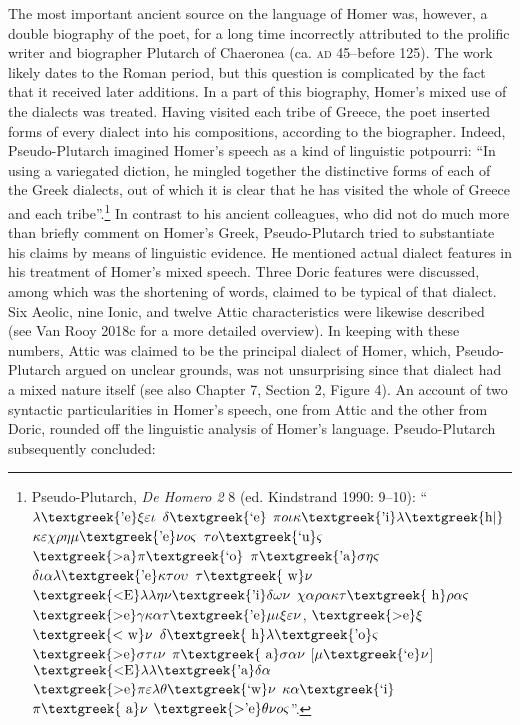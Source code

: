 \documentclass[12pt]{article}
\newenvironment{styleStandard}{\renewcommand\baselinestretch{1.25}\setlength\leftskip{0in}\setlength\rightskip{0in}\setlength\parindent{0.1972in}\setlength\parfillskip{0pt plus 1fil}\setlength\parskip{0in plus 1pt}\writerlistparindent\writerlistleftskip\leavevmode\normalfont\normalsize\writerlistlabel\ignorespaces}{\unskip\vspace{0in plus 1pt}\par}
\newcommand\writerlistleftskip{}
\newcommand\writerlistparindent{}
\newcommand\writerlistlabel{}
\newcounter{Figure}
\begin{document}
\begin{styleStandard}
The most important ancient source on the language of Homer was, however, a double biography of the poet, for a long time incorrectly attributed to the prolific writer and biographer Plutarch of Chaeronea (ca. \textsc{ad} 45–before 125). The work likely dates to the Roman period, but this question is complicated by the fact that it received later additions. In a part of this biography, Homer’s mixed use of the dialects was treated. Having visited each tribe of Greece, the poet inserted forms of every dialect into his compositions, according to the biographer. Indeed, Pseudo-Plutarch imagined Homer’s speech as a kind of linguistic potpourri: “In using a variegated diction, he mingled together the distinctive forms of each of the Greek dialects, out of which it is clear that he has visited the whole of Greece and each tribe”.\footnote{ Pseudo-Plutarch, \textit{De Homero 2} 8 (ed. Kindstrand 1990: 9–10): “$\lambda \text{\textgreek{'e}}\xi \varepsilon \iota $ $\delta \text{\textgreek{`e}}$ $\pi o\iota \kappa \text{\textgreek{'i}}\lambda \text{\textgreek{h|}}$ $\kappa \varepsilon \chi \rho \eta \mu \text{\textgreek{'e}}\nu o\varsigma $ $\tau o\text{\textgreek{`u}}\varsigma $ $\text{\textgreek{>a}}\pi \text{\textgreek{`o}}$ $\pi \text{\textgreek{'a}}\sigma \eta \varsigma $ $\delta \iota \alpha \lambda \text{\textgreek{'e}}\kappa \tau o\upsilon $ $\tau \text{\textgreek{~w}}\nu $ $\text{\textgreek{<E}}\lambda \lambda \eta \nu \text{\textgreek{'i}}\delta \omega \nu $ $\chi \alpha \rho \alpha \kappa \tau \text{\textgreek{~h}}\rho \alpha \varsigma $ $\text{\textgreek{>e}}\gamma \kappa \alpha \tau \text{\textgreek{'e}}\mu \iota \xi \varepsilon \nu $, $\text{\textgreek{>e}}\xi $ $\text{\textgreek{<~w}}\nu $ $\delta \text{\textgreek{~h}}\lambda \text{\textgreek{'o}}\varsigma $ $\text{\textgreek{>e}}\sigma \tau \iota \nu $ $\pi \text{\textgreek{~a}}\sigma \alpha \nu $ [$\mu \text{\textgreek{`e}}\nu $] $\text{\textgreek{<E}}\lambda \lambda \text{\textgreek{'a}}\delta \alpha $ $\text{\textgreek{>e}}\pi \varepsilon \lambda \theta \text{\textgreek{`w}}\nu $ $\kappa \alpha \text{\textgreek{`i}}$ $\pi \text{\textgreek{~a}}\nu $ $\text{\textgreek{>'e}}\theta \nu o\varsigma $”.} In contrast to his ancient colleagues, who did not do much more than briefly comment on Homer’s Greek, Pseudo-Plutarch tried to substantiate his claims by means of linguistic evidence. He mentioned actual dialect features in his treatment of Homer’s mixed speech. Three Doric features were discussed, among which was the shortening of words, claimed to be typical of that dialect. Six Aeolic, nine Ionic, and twelve Attic characteristics were likewise described (see Van Rooy 2018c for a more detailed overview). In keeping with these numbers, Attic was claimed to be the principal dialect of Homer, which, Pseudo-Plutarch argued on unclear grounds, was not unsurprising since that dialect had a mixed nature itself (see also Chapter 7, Section 2, Figure 4). An account of two syntactic particularities in Homer’s speech, one from Attic and the other from Doric, rounded off the linguistic analysis of Homer’s language. Pseudo-Plutarch subsequently concluded:
\end{styleStandard}
\end{document}

